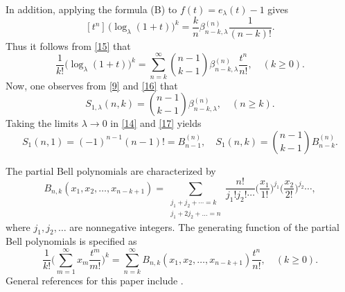 \documentclass[a4paper,11pt]{amsart}
\begin{document}
In addition, applying the formula (B) to $f(t)=e_{\lambda}(t)-1$ gives
\begin{equation} \label{15}
[t^{n}]\,\big(\log_{\lambda}(1+t)\big)^{k}=\frac{k}{n}\beta_{n-k,\lambda}^{(n)}\frac{1}{(n-k)!}.
\end{equation}
Thus it follows from \eqref{15} that 
\begin{equation} \label{16}
\frac{1}{k!}\big(\log_{\lambda}(1+t)\big)^{k}=\sum_{n=k}^{\infty}\binom{n-1}{k-1}\beta_{n-k,\lambda}^{(n)}\frac{t^{n}}{n!},\quad (k \ge 0).
\end{equation}
Now, one observes from \eqref{9} and \eqref{16} that
\begin{equation} \label{17}
S_{1,\lambda}(n,k)=\binom{n-1}{k-1}\beta_{n-k,\lambda}^{(n)}, \quad (n \ge k).
\end{equation}
Taking the limits $\lambda \rightarrow 0$ in \eqref{14} and \eqref{17} yields
\begin{equation} \label{18}
S_{1}(n,1)=(-1)^{n-1}(n-1)!=B_{n-1}^{(n)},\quad S_{1}(n,k)=\binom{n-1}{k-1}B_{n-k}^{(n)}.
\end{equation} \par
The partial Bell polynomials are characterized by
\begin{equation*}
B_{n,k}(x_{1},x_{2},\dots,x_{n-k+1})=\sum_{\substack{j_{1}+j_{2}+\cdots=k \\ j_{1}+2j_{2}+\dots=n}}\frac{n!}{j_{1}!j_{2}!\cdots}\Big(\frac{x_{1}}{1!} \Big)^{j_{1}}\Big(\frac{x_{2}}{2!}\Big)^{j_{2}}\cdots,
\end{equation*}
where $j_{1}, j_{2}, \dots$ are nonnegative integers. The generating function of the partial Bell polynomials is specified as
\begin{equation} \label{19}
\frac{1}{k!}\bigg(\sum_{m=1}^{\infty}x_{m}\frac{t^{m}}{m!}\bigg)^{k}=\sum_{n=k}^{\infty}B_{n,k}(x_{1},x_{2},\dots,x_{n-k+1})\frac{t^{n}}{n!}, \quad (k \ge 0).
\end{equation} 
General references for this paper include \cite{5,6,23,24,25,26,27}. \par
\end{document}
